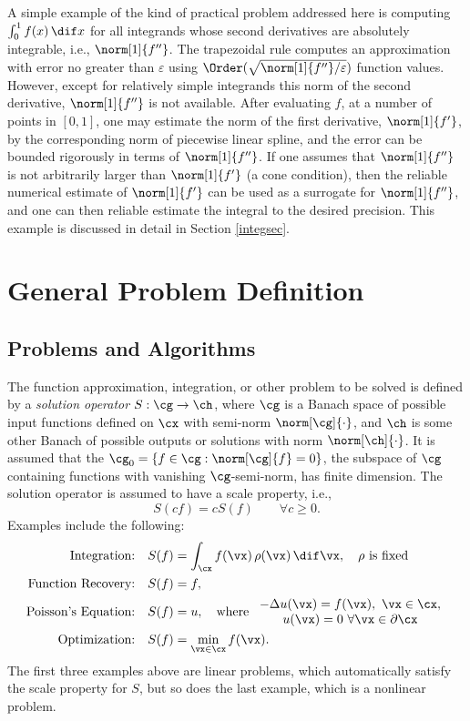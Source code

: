 \documentclass[final]{elsarticle}
\theoremstyle{definition}
\theoremstyle{remark}
\begin{document}
A simple example of the kind of practical problem addressed here is computing $\int_0^1 f(x) \, \dif x$ for all integrands whose second derivatives are absolutely integrable, i.e., $\norm[1]{f''}$.  The trapezoidal rule computes an approximation with error no greater than $\varepsilon$ using $\Order(\sqrt{\norm[1]{f''}/\varepsilon})$ function values.  However, except for relatively simple integrands this norm of the second derivative, $\norm[1]{f''}$ is not available.  After evaluating $f$, at a number of points in $[0,1]$, one may estimate the norm of the first derivative, $\norm[1]{f'}$, by the corresponding norm of piecewise linear spline, and the error can be bounded rigorously in terms of $\norm[1]{f''}$.  If one assumes that $\norm[1]{f''}$ is not arbitrarily larger than $\norm[1]{f'}$ (a cone condition), then the reliable numerical estimate of $\norm[1]{f'}$ can be used as a surrogate for $\norm[1]{f''}$, and one can then reliable estimate the integral to the desired precision.  This example is discussed in detail in Section \ref{integsec}.

\section{General Problem Definition}

\subsection{Problems and Algorithms} The function approximation, integration, or other problem to be solved is defined by a \emph{solution operator} $S:\cg \to \ch$, where $\cg$ is a Banach space of possible input functions defined on $\cx$ with semi-norm $\norm[\cg]{\cdot}$, and $\ch$ is some other Banach of possible outputs or solutions with norm $\norm[\ch]{\cdot}$. It is assumed that the $\cg_0 = \{f \in \cg :  \norm[\cg]{f}=0\}$, the subspace of $\cg$ containing functions with vanishing $\cg$-semi-norm, has finite dimension. The solution operator is assumed to have a scale property, i.e., 
\[
S(cf) = cS(f) \qquad \forall c\ge 0.
\]
Examples include the following:
\begin{align*}
\text{Integration:} \quad & S(f) = \int_{\cx} f(\vx) \, \rho(\vx) \, \dif \vx, \quad \rho \text{ is fixed}\\
\text{Function Recovery:} \quad & S(f) = f, \\
\text{Poisson's Equation:} \quad & S(f) = u, \quad \text{where } \begin{array}{c} -\Delta u(\vx) = f(\vx), \ \vx \in \cx, \\ u(\vx)=0 \ \forall \vx \in \partial \cx\end{array} \\
\text{Optimization:} \quad & S(f) = \min_{\vx \in \cx} f(\vx).
\end{align*}
The first three examples above are linear problems, which automatically satisfy the scale property for $S$, but so does the last example, which is a nonlinear problem.
\end{document}
